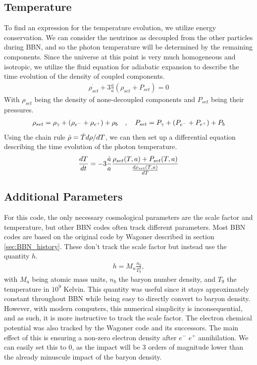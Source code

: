 \subsection{Temperature}
To find an expression for the temperature evolution, we utilize energy conservation. We can consider the neutrinos as decoupled from the other particles during BBN, and so the photon temperature will be determined by the remaining components. Since the universe at this point is very much homogeneous and isotropic, we utilize the fluid equation for adiabatic expansion \cite[{(4.44)}]{Ryden} to describe the time evolution of the density of coupled components.
\begin{align}
    \dot{\rho_{set}}+3\frac{\dot{a}}{a}(\rho_{set} + P_{set})=0
\end{align}
With $\rho_{set}$ being the density of none-decoupled components and $P_{set}$ being their pressures.
\begin{align}
    \rho_{set}=\rho_{\gamma}+(\rho_{e^-}+\rho_{e^+})+\rho_{b}
    \quad , \quad P_{set}=P_{\gamma}+(P_{e^-}+P_{e^+})+P_{b}
\end{align}
Using the chain rule $\dot{\rho}=\dot{T}d\rho/dT$, we can then set up a differential equation describing the time evolution of the photon temperature. 
\begin{align}
    \frac{dT}{dt}=-3\frac{\dot{a}}{a}\frac{\rho_{set}(T,a) + P_{set}(T,a)}{\frac{d\rho_{set}(T,a)}{dT}}
    \label{eq:dTdt}
\end{align}

\subsection{Additional Parameters}
For this code, the only necessary cosmological parameters are the scale factor and temperature, but other BBN codes often track different parameters. Most BBN codes are based on the original code by Wagoner described in section \ref{sec:BBN_history}. These don't track the scale factor but instead use the quantity $h$.
\begin{align}
    h=M_u\frac{n_{b}}{T^3_9},
\end{align}
with $M_u$ being atomic mass units, $n_b$ the baryon number density, and  $T_9$ the temperature in $10^9$ Kelvin. This quantity was useful since it stays approximately constant throughout BBN while being easy to directly convert to baryon density. However, with modern computers, this numerical simplicity is inconsequential, and as such, it is more instructive to track the scale factor.
The electron chemical potential was also tracked by the Wagoner code and its successors. The main effect of this is ensuring a non-zero electron density after $e^-$ $e^+$ annihilation. We can easily set this to 0, as the impact will be 3 orders of magnitude lower than the already minuscule impact of the baryon density.

